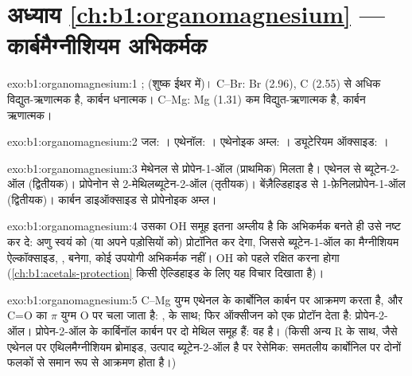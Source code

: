 \section*{अध्याय \ref{ch:b1:organomagnesium} --- कार्बमैग्नीशियम अभिकर्मक}

\begin{solution}{exo:b1:organomagnesium:1}
;  (शुष्क
ईथर में)। C--Br: Br (2.96), C (2.55) से अधिक विद्युत-ऋणात्मक है, कार्बन
धनात्मक। C--Mg: Mg (1.31) कम विद्युत-ऋणात्मक है, कार्बन ऋणात्मक।
\end{solution}

\begin{solution}{exo:b1:organomagnesium:2}
जल: ।
एथेनॉल: ।
एथेनोइक अम्ल: ।
ड्यूटेरियम ऑक्साइड: ।
\end{solution}

\begin{solution}{exo:b1:organomagnesium:3}
मेथेनल से प्रोपेन-1-ऑल (प्राथमिक) मिलता है। एथेनल से ब्यूटेन-2-ऑल (द्वितीयक)।
प्रोपेनोन से 2-मेथिलब्यूटेन-2-ऑल (तृतीयक)। बेंज़ैल्डिहाइड से
1-फ़ेनिलप्रोपेन-1-ऑल (द्वितीयक)। कार्बन डाइऑक्साइड से प्रोपेनोइक अम्ल।
\end{solution}

\begin{solution}{exo:b1:organomagnesium:4}
उसका OH समूह इतना अम्लीय है कि अभिकर्मक बनते ही उसे नष्ट कर दे:
अणु स्वयं को (या अपने पड़ोसियों को) प्रोटॉनित कर देगा, जिससे
ब्यूटेन-1-ऑल का मैग्नीशियम ऐल्कॉक्साइड, , बनेगा, कोई उपयोगी
अभिकर्मक नहीं। OH को पहले रक्षित करना होगा
(\cref{ch:b1:acetals-protection} किसी ऐल्डिहाइड के लिए यह विचार दिखाता है)।
\end{solution}

\begin{solution}{exo:b1:organomagnesium:5}
C--Mg युग्म एथेनल के कार्बोनिल कार्बन पर आक्रमण करता है, और C=O का $\pi$ युग्म
O पर चला जाता है: ,  के साथ; फिर 
ऑक्सीजन को एक प्रोटॉन देता है: प्रोपेन-2-ऑल। प्रोपेन-2-ऑल के कार्बिनॉल कार्बन पर
दो मेथिल समूह हैं: वह  है। (किसी अन्य R के साथ, जैसे
एथेनल पर एथिलमैग्नीशियम ब्रोमाइड, उत्पाद ब्यूटेन-2-ऑल  है पर
रेसेमिक: समतलीय कार्बोनिल पर दोनों फलकों से समान रूप से आक्रमण होता है।)
\end{solution}

